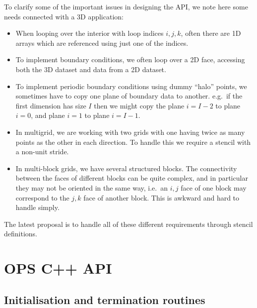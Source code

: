 \documentclass[11pt]{article}
\begin{document}
\noindent To clarify some of the important issues in designing the API, we note here some needs connected with a 3D
application:
\begin{itemize}
\item
When looping over the interior with loop indices $i,j,k$, often there are 1D arrays which are referenced using just one 
of the indices.

\item
To implement boundary conditions, we often loop over a 2D face, accessing both the 3D dataset and data from a 2D 
dataset.

\item
To implement periodic boundary conditions using dummy ``halo'' points, we sometimes have to copy one plane of boundary 
data to another.  e.g.~if the first dimension has size $I$ then we might copy the plane $i=I\!-\!2$ to plane $i=0$, and 
plane $i=1$ to plane $i=I\!-\!1$.

\item
In multigrid, we are working with two grids with one having twice as many points as the other in each direction.  To 
handle this we require a stencil with a non-unit stride.

\item
In multi-block grids, we have several structured blocks. The connectivity between the faces of different blocks can 
be quite complex, and in particular they may not be oriented in the same way, i.e.~an $i,j$ face of one block may 
correspond to the $j,k$ face of another block.  This is awkward and hard to handle simply.
\end{itemize}

\noindent The latest proposal is to handle all of these different requirements through stencil definitions.


\clearpage

\newpage
\section{OPS C++ API}

\subsection{Initialisation and termination routines}
\end{document}
